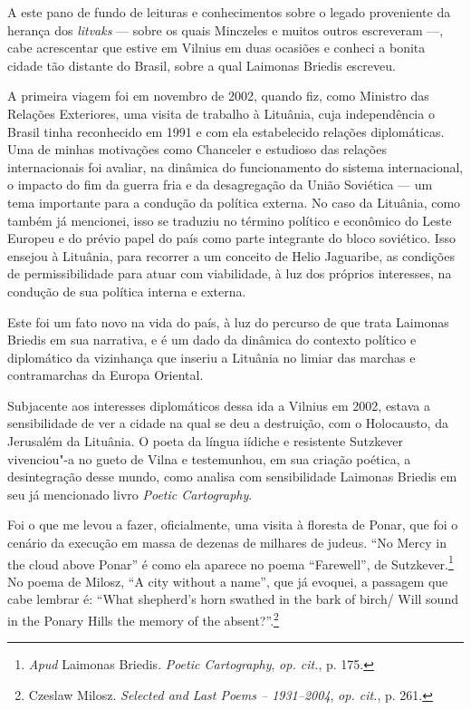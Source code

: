 A este pano de fundo de leituras e conhecimentos sobre o legado
proveniente da herança dos \textit{litvaks} --- sobre os quais Minczeles e
muitos outros escreveram ---, cabe acrescentar que estive em Vilnius em
duas ocasiões e conheci a bonita cidade tão distante do Brasil, sobre a
qual Laimonas Briedis escreveu.

A primeira viagem foi em novembro de 2002, quando fiz, como Ministro das
Relações Exteriores, uma visita de trabalho à Lituânia, cuja
independência o Brasil tinha reconhecido em 1991 e com ela estabelecido
relações diplomáticas. Uma de minhas motivações como Chanceler e
estudioso das relações internacionais foi avaliar, na dinâmica do
funcionamento do sistema internacional, o impacto do fim da guerra fria
e da desagregação da União Soviética --- um tema importante para a
condução da política externa. No caso da Lituânia, como também já
mencionei, isso se traduziu no término político e econômico do Leste
Europeu e do prévio papel do país como parte integrante do bloco
soviético. Isso ensejou à Lituânia, para recorrer a um conceito de Helio
Jaguaribe, as condições de permissibilidade para atuar com viabilidade,
à luz dos próprios interesses, na condução de sua política interna e
externa.

Este foi um fato novo na vida do país, à luz do percurso de que trata
Laimonas Briedis em sua narrativa, e é um dado da dinâmica do contexto
político e diplomático da vizinhança que inseriu a Lituânia no limiar
das marchas e contramarchas da Europa Oriental.

Subjacente aos interesses diplomáticos dessa ida a Vilnius em 2002,
estava a sensibilidade de ver a cidade na qual se deu a destruição, com
o Holocausto, da Jerusalém da Lituânia. O poeta da língua iídiche e
resistente Sutzkever vivenciou"-a no gueto de Vilna e testemunhou, em sua
criação poética, a desintegração desse mundo, como analisa com
sensibilidade Laimonas Briedis em seu já mencionado livro \textit{Poetic
Cartography}.

Foi o que me levou a fazer, oficialmente, uma visita à floresta de
Ponar, que foi o cenário da execução em massa de dezenas de milhares de
judeus. ``No Mercy in the cloud above Ponar'' é como ela aparece no
poema ``Farewell'', de Sutzkever.\footnote{\textit{Apud} Laimonas Briedis.
  \textit{Poetic Cartography}, \textit{op. cit.}, p. 175.} No poema de
Milosz, ``A city without a name'', que já evoquei, a passagem que cabe
lembrar é: ``What shepherd's horn swathed in the bark of birch/ Will
sound in the Ponary Hills the memory of the absent?''.\footnote{Czeslaw
  Milosz. \textit{Selected and Last Poems -- 1931--2004}, \textit{op.
  cit.}, p. 261.}

